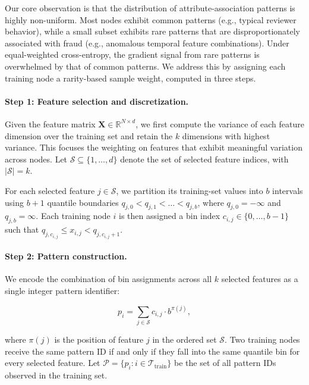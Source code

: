 Our core observation is that the distribution of attribute-association patterns is highly non-uniform. Most nodes exhibit common patterns (e.g., typical reviewer behavior), while a small subset exhibits rare patterns that are disproportionately associated with fraud (e.g., anomalous temporal feature combinations). Under equal-weighted cross-entropy, the gradient signal from rare patterns is overwhelmed by that of common patterns. We address this by assigning each training node a rarity-based sample weight, computed in three steps.

\paragraph{Step 1: Feature selection and discretization.}
Given the feature matrix $\mathbf{X} \in \mathbb{R}^{N \times d}$, we first compute the variance of each feature dimension over the training set and retain the $k$ dimensions with highest variance. This focuses the weighting on features that exhibit meaningful variation across nodes. Let $\mathcal{S} \subseteq \{1, \dots, d\}$ denote the set of selected feature indices, with $|\mathcal{S}| = k$.

For each selected feature $j \in \mathcal{S}$, we partition its training-set values into $b$ intervals using $b+1$ quantile boundaries $q_{j,0} < q_{j,1} < \dots < q_{j,b}$, where $q_{j,0} = -\infty$ and $q_{j,b} = \infty$. Each training node $i$ is then assigned a bin index $c_{i,j} \in \{0, \dots, b-1\}$ such that $q_{j, c_{i,j}} \leq x_{i,j} < q_{j, c_{i,j}+1}$.

\paragraph{Step 2: Pattern construction.}
We encode the combination of bin assignments across all $k$ selected features as a single integer pattern identifier:

\begin{equation}
p_i = \sum_{j \in \mathcal{S}} c_{i,j} \cdot b^{\pi(j)},
\label{eq:pattern_id}
\end{equation}

where $\pi(j)$ is the position of feature $j$ in the ordered set $\mathcal{S}$. Two training nodes receive the same pattern ID if and only if they fall into the same quantile bin for every selected feature. Let $\mathcal{P} = \{p_i : i \in \mathcal{T}_{\text{train}}\}$ be the set of all pattern IDs observed in the training set.

